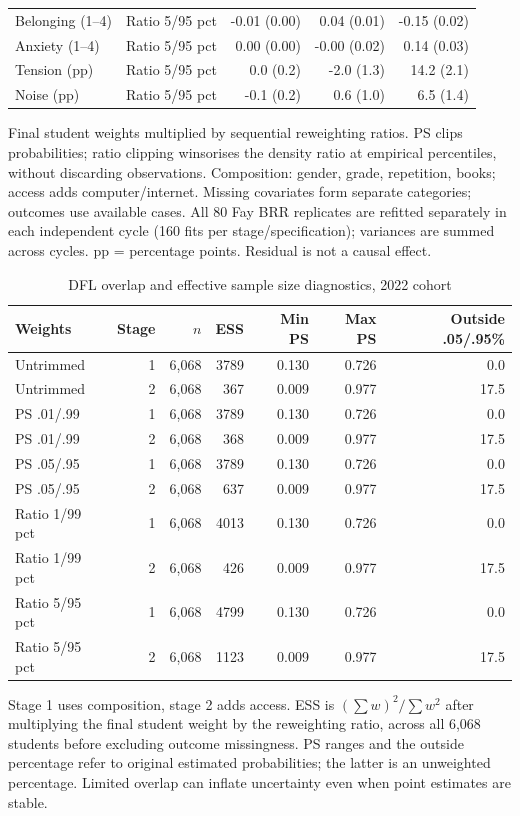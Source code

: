 \begin{table}[H]
\begin{tabular}{@{}llrrr@{}}
Belonging (1--4) & Ratio 5/95 pct & -0.01 (0.00) & 0.04 (0.01) & -0.15 (0.02)\\
Anxiety (1--4) & Ratio 5/95 pct & 0.00 (0.00) & -0.00 (0.02) & 0.14 (0.03)\\
Tension (pp) & Ratio 5/95 pct & 0.0 (0.2) & -2.0 (1.3) & 14.2 (2.1)\\
Noise (pp) & Ratio 5/95 pct & -0.1 (0.2) & 0.6 (1.0) & 6.5 (1.4)\\
\bottomrule
\end{tabular}
\par\smallskip\raggedright\footnotesize Final student weights multiplied by sequential reweighting ratios. PS clips probabilities; ratio clipping winsorises the density ratio at empirical percentiles, without discarding observations. Composition: gender, grade, repetition, books; access adds computer/internet. Missing covariates form separate categories; outcomes use available cases. All 80 Fay BRR replicates are refitted separately in each independent cycle (160 fits per stage/specification); variances are summed across cycles. pp = percentage points. Residual is not a causal effect.
\end{table}

\begin{table}[H]\centering\scriptsize
\caption{DFL overlap and effective sample size diagnostics, 2022 cohort}\label{tab:overlap}
\begin{tabular}{@{}lrrrrrr@{}}
\toprule
Weights & Stage & $n$ & ESS & Min PS & Max PS & Outside .05/.95\%\\
\midrule
Untrimmed & 1 & 6,068 & 3789 & 0.130 & 0.726 & 0.0\\
Untrimmed & 2 & 6,068 & 367 & 0.009 & 0.977 & 17.5\\
PS .01/.99 & 1 & 6,068 & 3789 & 0.130 & 0.726 & 0.0\\
PS .01/.99 & 2 & 6,068 & 368 & 0.009 & 0.977 & 17.5\\
PS .05/.95 & 1 & 6,068 & 3789 & 0.130 & 0.726 & 0.0\\
PS .05/.95 & 2 & 6,068 & 637 & 0.009 & 0.977 & 17.5\\
Ratio 1/99 pct & 1 & 6,068 & 4013 & 0.130 & 0.726 & 0.0\\
Ratio 1/99 pct & 2 & 6,068 & 426 & 0.009 & 0.977 & 17.5\\
Ratio 5/95 pct & 1 & 6,068 & 4799 & 0.130 & 0.726 & 0.0\\
Ratio 5/95 pct & 2 & 6,068 & 1123 & 0.009 & 0.977 & 17.5\\
\bottomrule
\end{tabular}
\par\smallskip\raggedright\footnotesize Stage 1 uses composition, stage 2 adds access. ESS is $(\sum w)^2/\sum w^2$ after multiplying the final student weight by the reweighting ratio, across all 6,068 students before excluding outcome missingness. PS ranges and the outside percentage refer to original estimated probabilities; the latter is an unweighted percentage. Limited overlap can inflate uncertainty even when point estimates are stable.
\end{table}

